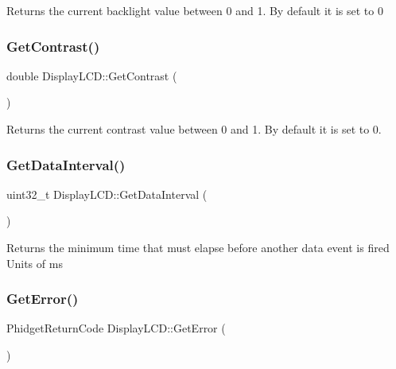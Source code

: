 Returns the current backlight value between 0 and 1. By default it is set to 0\mbox{\label{classDisplayLCD_ab7ec5dfb25093bf45480807989db4049}} 
\subsubsection{\texorpdfstring{Get\+Contrast()}{GetContrast()}}
{\footnotesize\ttfamily double Display\+L\+C\+D\+::\+Get\+Contrast (\begin{DoxyParamCaption}{ }\end{DoxyParamCaption})\hspace{0.3cm}{\ttfamily [inline]}}

Returns the current contrast value between 0 and 1. By default it is set to 0.\mbox{\label{classDisplayLCD_a4d5cb25aaf17312c7639422f44df7071}} 
\subsubsection{\texorpdfstring{Get\+Data\+Interval()}{GetDataInterval()}}
{\footnotesize\ttfamily uint32\+\_\+t Display\+L\+C\+D\+::\+Get\+Data\+Interval (\begin{DoxyParamCaption}{ }\end{DoxyParamCaption})\hspace{0.3cm}{\ttfamily [inline]}}

Returns the minimum time that must elapse before another data event is fired Units of ms\mbox{\label{classDisplayLCD_aa1c6e2464e7a21f1d2298efb50f4f5cf}} 
\subsubsection{\texorpdfstring{Get\+Error()}{GetError()}}
{\footnotesize\ttfamily Phidget\+Return\+Code Display\+L\+C\+D\+::\+Get\+Error (\begin{DoxyParamCaption}{ }\end{DoxyParamCaption})\hspace{0.3cm}{\ttfamily [inline]}}

